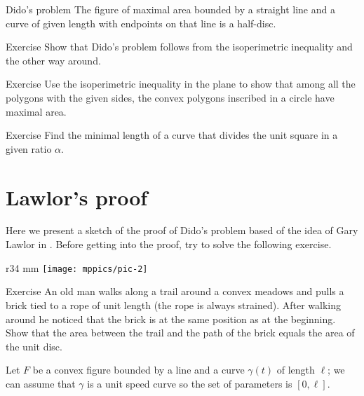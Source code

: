 \begin{thm}{Dido's problem}
The figure of maximal area bounded by a straight line and a curve of given length with endpoints on that line is a half-disc.
\end{thm}

\begin{thm}{Exercise}\label{ex:dido-isop}
Show that Dido's problem follows from the isoperimetric inequality and the other way around.
\end{thm}


\begin{thm}{Exercise}
Use the isoperimetric inequality in the plane to show that 
among all the polygons with the given sides,
the convex polygons inscribed in a circle have maximal area.
\end{thm}

\begin{thm}{Exercise}
Find the minimal length of a curve that divides the unit square in a given ratio $\alpha$.  
\end{thm}

\section{Lawlor's proof}

Here we present a sketch of the proof of Dido's problem based of the idea of Gary Lawlor in \cite{lawlor}.
Before getting into the proof, try to solve the following exercise.

{

\begin{wrapfigure}{r}{34 mm}
\vskip-4mm
\centering
\texttt{[image: mppics/pic-2]}
\end{wrapfigure}

\begin{thm}{Exercise}
An old man walks along a trail around a convex meadows and pulls a brick tied to a rope of unit length (the rope is always strained).
After walking around he noticed that the brick is at the same position as at the beginning.
Show that the area between the trail and the path of the brick equals the area of the unit disc. 

\end{thm}

}

Let $F$ be a convex figure bounded by a line and a curve $\gamma(t)$ of length $\ell$;
we can assume that $\gamma$ is a unit speed curve so the set of parameters is $[0,\ell]$.

